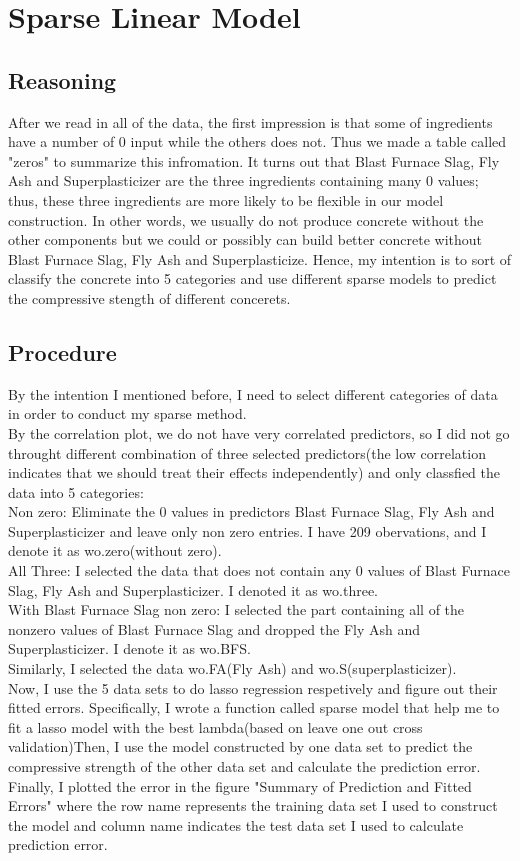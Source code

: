 \documentclass{article}\usepackage[]{graphicx}\usepackage[]{color}
\begin{document}
\section*{Sparse Linear Model}
\subsection*{Reasoning}
After we read in all of the data, the first impression is that some of ingredients have a number of 0 input while the others does not. Thus we made a table called "zeros" to summarize this infromation. It turns out that Blast Furnace Slag, Fly Ash and Superplasticizer are the three ingredients containing many 0 values; thus, these three ingredients are more likely to be flexible in our model construction. In other words, we usually do not produce concrete without the other components but we could or possibly can build better concrete without Blast Furnace Slag, Fly Ash and Superplasticize. Hence, my intention is to sort of classify the concrete into 5 categories and use different sparse models to predict the compressive stength of different concerets.\\

\subsection*{Procedure}
By the intention I mentioned before, I need to select different categories of data in order to conduct my sparse method.\\
By the correlation plot, we do not have very correlated predictors, so I did not go throught different combination of three selected predictors(the low correlation indicates that we should treat their effects independently) and only classfied the data into 5 categories:\\
Non zero: Eliminate the 0 values in predictors Blast Furnace Slag, Fly Ash and Superplasticizer and leave only non zero entries. I have 209 obervations, and I denote it as wo.zero(without zero). \\
All Three: I selected the data that does not contain any 0 values of Blast Furnace Slag, Fly Ash and Superplasticizer. I denoted it as wo.three.\\
With Blast Furnace Slag non zero: I selected the part containing all of the nonzero values of Blast Furnace Slag and dropped the Fly Ash and Superplasticizer. I denote it as wo.BFS.\\
Similarly, I selected the data wo.FA(Fly Ash) and wo.S(superplasticizer).\\
Now, I use the 5 data sets to do lasso regression respetively and figure out their fitted errors. Specifically, I wrote a function called sparse model that help me to fit a lasso model with the best lambda(based on leave one out cross validation)Then, I use the model constructed by one data set to predict the compressive strength of the other data set and calculate the prediction error. Finally, I plotted the error in the figure "Summary of Prediction and Fitted Errors" where the row name represents the training data set I used to construct the model and column name indicates the test data set I used to calculate prediction error.\\
\end{document}

